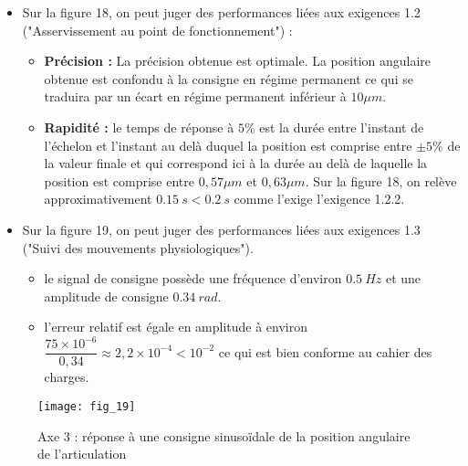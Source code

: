 \ifprof
\begin{corrige}
\begin{itemize}
\item Sur la figure 18, on peut juger des performances liées aux exigences 1.2 ("Asservissement au point de fonctionnement") :
\begin{itemize}
\item \textbf{Précision :} La précision obtenue est optimale. La position angulaire obtenue est confondu à la consigne en régime permanent ce qui se traduira par un écart en régime permanent inférieur à $10\mu m$.
\item \textbf{Rapidité : } le temps de réponse à $5\%$ est la durée entre l'instant de l'échelon et l'instant au delà duquel la position est comprise entre $\pm 5\%$ de la valeur finale et qui correspond ici à la durée au delà de laquelle la position est comprise entre $0,57\mu m$ et $0,63\mu m$. Sur la figure 18, on relève approximativement $\SI{0,15}{s}<\SI{0,2}{s}$ comme l'exige l'exigence 1.2.2.  
\end{itemize}
\item Sur la figure 19, on peut juger des performances liées aux exigences 1.3 ("Suivi des mouvements physiologiques"). 
\begin{itemize}
\item le signal de consigne possède une fréquence d'environ $\SI{0,5}{Hz}$ et une amplitude de consigne $\SI{0,34}{rad}$. 
\item l'erreur relatif est égale en amplitude à environ $\dfrac{75\times 10^{-6}}{0,34}\approx 2,2\times 10^{-4}<10^{-2}$ ce qui est bien conforme au cahier des charges.
\end{itemize}
\end{itemize}
\end{corrige}
\else
\fi
\ifprof
\else
\begin{figure}[!h]
\centering
\texttt{[image: fig\_19]}

\caption{\label{fig_19} Axe 3 : réponse à une consigne sinusoïdale de la position angulaire de l’articulation}
\end{figure}
\fi
